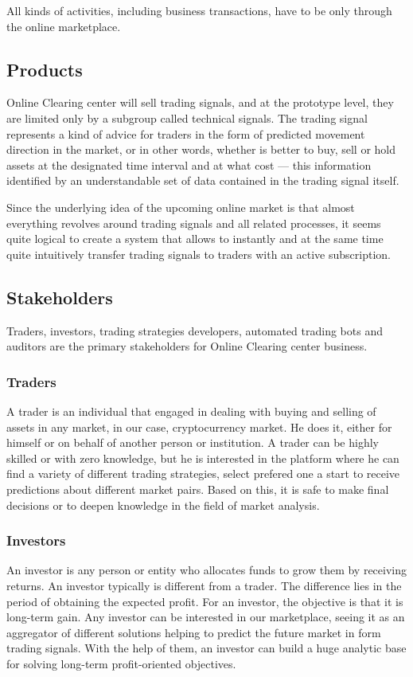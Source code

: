 \documentclass[thesis=B,english]{FITthesis}[2019/03/06]
\begin{document}
All kinds of activities, including business transactions, have to be only through the online marketplace. 

\subsection{Products}
Online Clearing center will sell trading signals, and at the prototype level, they are limited only by a subgroup called technical signals. The trading signal represents a kind of advice for traders in the form of predicted movement direction in the market, or in other words, whether is better to buy, sell or hold assets at the designated time interval and at what cost — this information identified by an understandable set of data contained in the trading signal itself.

Since the underlying idea of the upcoming online market is that almost everything revolves around trading signals and all related processes, it seems quite logical to create a system that allows to instantly and at the same time quite intuitively transfer trading signals to traders with an active subscription. 
 
\subsection{Stakeholders}
Traders,  investors, trading strategies developers, automated trading bots and auditors are the primary stakeholders for Online Clearing center business.

\subsubsection*{Traders}
A trader is an individual that engaged in dealing with buying and selling of assets in any market, in our case, cryptocurrency market. He does it, either for himself or on behalf of another person or institution.  A trader can be highly skilled or with zero knowledge, but he is interested in the platform where he can find a variety of different trading strategies, select prefered one a start to receive predictions about different market pairs. Based on this, it is safe to make final decisions or to deepen knowledge in the field of market analysis.

\subsubsection*{Investors}
An investor is any person or entity who allocates funds to grow them by receiving returns. An investor typically is different from a trader. The difference lies in the period of obtaining the expected profit. For an investor, the objective is that it is long-term gain. Any investor can be interested in our marketplace, seeing it as an aggregator of different solutions helping to predict the future market in form trading signals. With the help of them, an investor can build a huge analytic base for solving long-term profit-oriented objectives.
\end{document}
